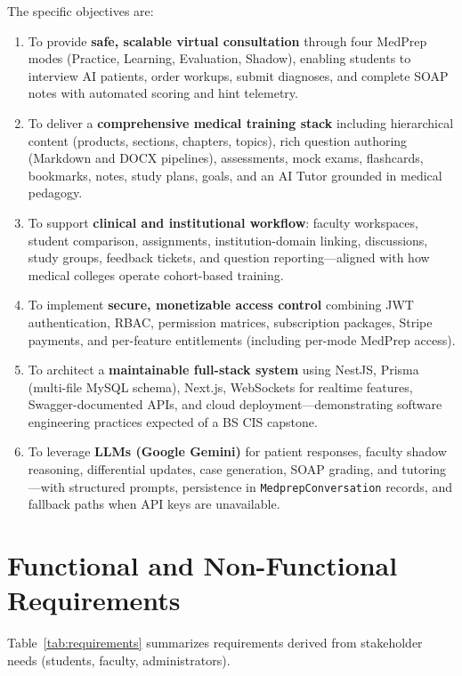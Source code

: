 The specific objectives are:
\begin{enumerate}
  \item To provide \textbf{safe, scalable virtual consultation} through four MedPrep modes (Practice, Learning, Evaluation, Shadow), enabling students to interview AI patients, order workups, submit diagnoses, and complete SOAP notes with automated scoring and hint telemetry.
  \item To deliver a \textbf{comprehensive medical training stack} including hierarchical content (products, sections, chapters, topics), rich question authoring (Markdown and DOCX pipelines), assessments, mock exams, flashcards, bookmarks, notes, study plans, goals, and an AI Tutor grounded in medical pedagogy.
  \item To support \textbf{clinical and institutional workflow}: faculty workspaces, student comparison, assignments, institution-domain linking, discussions, study groups, feedback tickets, and question reporting---aligned with how medical colleges operate cohort-based training.
  \item To implement \textbf{secure, monetizable access control} combining JWT authentication, RBAC, permission matrices, subscription packages, Stripe payments, and per-feature entitlements (including per-mode MedPrep access).
  \item To architect a \textbf{maintainable full-stack system} using NestJS, Prisma (multi-file MySQL schema), Next.js, WebSockets for realtime features, Swagger-documented APIs, and cloud deployment---demonstrating software engineering practices expected of a BS CIS capstone.
  \item To leverage \textbf{LLMs (Google Gemini)} for patient responses, faculty shadow reasoning, differential updates, case generation, SOAP grading, and tutoring---with structured prompts, persistence in \texttt{MedprepConversation} records, and fallback paths when API keys are unavailable.
\end{enumerate}

\section{Functional and Non-Functional Requirements}
Table~\ref{tab:requirements} summarizes requirements derived from stakeholder needs (students, faculty, administrators).

